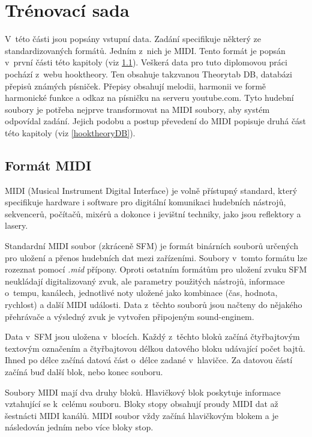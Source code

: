 \chapter{Trénovací sada}
V~této části jsou popsány vstupní data.
Zadání specifikuje některý ze standardizovaných formátů.
Jedním z~nich je MIDI.
Tento formát je popsán v~první části této kapitoly (viz \ref{midisoubory}).
Veškerá data pro tuto diplomovou práci pochází z~webu hooktheory.
Ten obsahuje takzvanou Theorytab DB, databázi přepisů známých písniček.
Přepisy obsahují melodii, harmonii ve formě harmonické funkce 
a odkaz na písničku na serveru youtube.com.
Tyto hudební soubory je potřeba nejprve transformovat na MIDI soubory,
aby systém odpovídal zadání.
Jejich podobu a postup převedení do MIDI popisuje druhá část této kapitoly (viz \ref{hooktheoryDB}).

\section{Formát MIDI}
\label{midisoubory}
MIDI (Musical Instrument Digital Interface) je volně přístupný standard,
který specifikuje hardware i software 
pro digitální komunikaci hudebních nástrojů,
sekvencerů, počítačů, mixérů 
a dokonce i jevištní techniky, jako jsou reflektory a lasery.
\cite{MIDI_tutorials}
\par

Standardní MIDI soubor (zkráceně SFM) je formát binárních souborů 
určených pro uložení a přenos hudebních dat mezi zařízeními.
Soubory v~tomto formátu lze rozeznat pomocí \emph{.mid} přípony.
Oproti ostatním formátům pro uložení zvuku 
SFM neukládají digitalizovaný zvuk,
ale parametry použitých nástrojů, informace o~tempu, kanálech, 
jednotlivé noty uložené jako kombinace (čas, hodnota, rychlost) 
a další MIDI události.
Data z~těchto souborů jsou načteny do nějakého přehrávače 
a výsledný zvuk je vytvořen připojeným sound-enginem.
\cite{MIDI_tutorials,Glatt_aboutMIDIFiles}
\par

Data v~SFM jsou uložena v~blocích.
Každý z~těchto bloků začíná čtyřbajtovým textovým označením 
a čtyřbajtovou délkou datového bloku udávající počet bajtů.
Ihned po délce začíná datová část o~délce zadané v~hlavičce.
Za datovou částí začíná buď další blok, nebo konec souboru.
\cite{MIDI_tutorials,Back_SMF_Specif}
\par

Soubory MIDI mají dva druhy bloků. 
Hlavičkový blok poskytuje informace vztahující se k~celému souboru.
Bloky stopy obsahují proudy MIDI dat až šestnácti MIDI kanálů.
MIDI soubor vždy začíná hlavičkovým blokem 
a je následován jedním nebo více bloky stop\cite{Back_SMF_Specif}.

